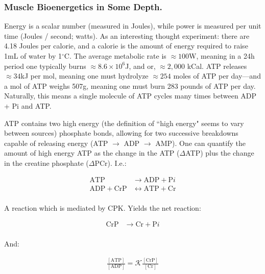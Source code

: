\subsubsection{Muscle Bioenergetics in Some Depth.}

Energy is a scalar number (measured in Joules), while power is measured per unit time (Joules / second; watts). As an interesting thought experiment: there are 4.18 Joules per calorie, and a calorie is the amount of energy required to raise 1mL of water by 1$^\circ$C. The average metabolic rate is $\approx 100$W, meaning in a 24h period one typically burns $\approx 8.6 \times 10^6$J, and or, $\approx 2,000$ kCal. ATP releases $\approx 34$kJ per mol, meaning one must hydrolyze $\approx 254$ moles of ATP per day---and a mol of ATP weighs 507g, meaning one must burn 283 pounds of ATP per day. Naturally, this means a single molecule of ATP cycles many times between ADP + Pi and ATP. \newline 

ATP contains two high energy (the definition of         ``high energy" seems to vary between sources) phosphate bonds, allowing for two successive breakdowns capable of releasing energy (ATP $\rightarrow$ ADP $\rightarrow$ AMP). One can quantify the amount of high energy ATP as the change in the ATP ($\Delta$ATP) plus the change in the creatine phosphate ($\Delta$PCr). I.e.: 

\begin{equation}
\begin{split}
    \mathrm{ATP} &\rightarrow \mathrm{ADP} + \mathrm{P}i \\
    \mathrm{ADP} + \mathrm{CrP} & \leftrightarrow \mathrm{ATP} + \mathrm{Cr} \\
\end{split}
\end{equation}

A reaction which is mediated by CPK. Yields the net reaction: 

\begin{equation}
\begin{split}
    \mathrm{CrP} &\rightarrow \mathrm{Cr} + \mathrm{P}i \\
\end{split}
\end{equation}

And: 

\begin{equation}
\begin{split}
    \frac{[\mathrm{ATP}]}{[\mathrm{ADP}]} = \mathcal{K} \frac{[\mathrm{CrP}]}{[\mathrm{Cr}]}
\end{split}
\end{equation}


